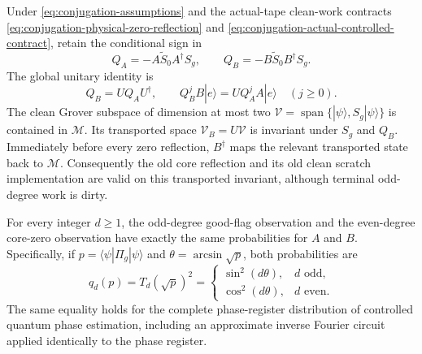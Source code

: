 \begin{theorem}
\label{thm:exact-preparation-conjugation}
Under \eqref{eq:conjugation-assumptions} and the actual-tape clean-work
contracts \eqref{eq:conjugation-physical-zero-reflection} and
\eqref{eq:conjugation-actual-controlled-contract}, retain the
conditional sign in
\begin{equation}
 Q_A=-A\widetilde S_0 A^\dagger S_g,\qquad
 Q_B=-B\widetilde S_0 B^\dagger S_g.
 \label{eq:conjugation-iterates}
\end{equation}
The global unitary identity is
\begin{equation}
 Q_B=U Q_A U^\dagger,\qquad
 Q_B^j B|e\rangle=UQ_A^j A|e\rangle\quad(j\geq0).
 \label{eq:conjugation-global-identity}
\end{equation}
The clean Grover subspace of dimension at most two
$\mathcal V=\operatorname{span}\{|\psi\rangle,S_g|\psi\rangle\}$ is
contained in $\mathcal M$. Its transported space
$\mathcal V_B=U\mathcal V$ is invariant under $S_g$ and $Q_B$.
Immediately before every zero reflection, $B^\dagger$ maps the
relevant transported state back to $\mathcal M$. Consequently the old
core reflection and its old clean scratch implementation are valid on
this transported invariant, although terminal odd-degree work is dirty.

For every integer $d\geq1$, the odd-degree good-flag observation and
the even-degree core-zero observation have exactly the same
probabilities for $A$ and $B$. Specifically, if
$p=\langle\psi|\Pi_g|\psi\rangle$ and
$\theta=\arcsin\sqrt p$, both probabilities are
\begin{equation}
 q_d(p)=T_d(\sqrt p)^2
 =\begin{cases}
   \sin^2(d\theta),&d\text{ odd},\\
   \cos^2(d\theta),&d\text{ even}.
  \end{cases}
 \label{eq:conjugation-parity-signal}
\end{equation}
The same equality holds for the complete phase-register distribution
of controlled quantum phase estimation, including an approximate
inverse Fourier circuit applied identically to the phase register.
\end{theorem}
